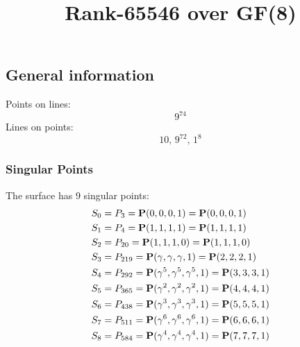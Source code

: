 \documentclass{article}
\newcommand\setTBstruts{\def\T{\rule{0pt}{2.6ex}}%
\def\B{\rule[-1.2ex]{0pt}{0pt}}}
\newcommand{\bP}{{\bf P}}
\begin{document}
 
\setTBstruts



{\allowdisplaybreaks%






\title{Rank-65546 over GF(8)}
\author{}%
\maketitle%
%
{}



\subsection*{General information}
Points on lines:
$$
9^{74}$$
Lines on points:
$$
10,\,9^{72},\,1^8$$
\subsubsection*{Singular Points}
The surface has 9 singular points:\\
\begin{align*}
S_{0} &= P_{3}=\bP(0, 0, 0, 1) = \bP(0, 0, 0, 1)\\
S_{1} &= P_{4}=\bP(1, 1, 1, 1) = \bP(1, 1, 1, 1)\\
S_{2} &= P_{20}=\bP(1, 1, 1, 0) = \bP(1, 1, 1, 0)\\
S_{3} &= P_{219}=\bP(\gamma , \gamma , \gamma , 1) = \bP(2, 2, 2, 1)\\
S_{4} &= P_{292}=\bP(\gamma^{5}, \gamma^{5}, \gamma^{5}, 1) = \bP(3, 3, 3, 1)\\
S_{5} &= P_{365}=\bP(\gamma^{2}, \gamma^{2}, \gamma^{2}, 1) = \bP(4, 4, 4, 1)\\
S_{6} &= P_{438}=\bP(\gamma^{3}, \gamma^{3}, \gamma^{3}, 1) = \bP(5, 5, 5, 1)\\
S_{7} &= P_{511}=\bP(\gamma^{6}, \gamma^{6}, \gamma^{6}, 1) = \bP(6, 6, 6, 1)\\
S_{8} &= P_{584}=\bP(\gamma^{4}, \gamma^{4}, \gamma^{4}, 1) = \bP(7, 7, 7, 1)\\
\end{align*}
}
\end{document}
